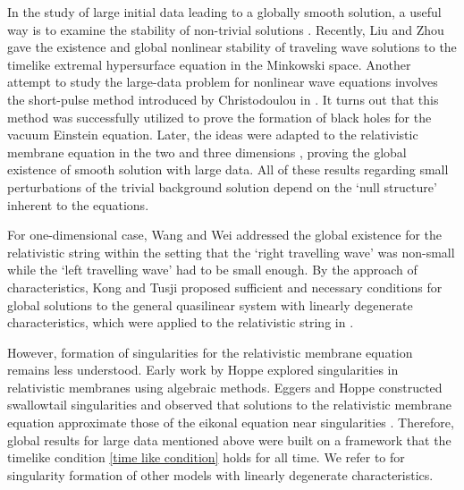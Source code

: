 \documentclass[10pt,leqno]{amsart}
\numberwithin{equation}{section}
\begin{document}
In the study of large initial data leading to a globally smooth solution, 
a useful way is to examine the stability of non-trivial solutions \cite{DonningerKS16}. Recently, Liu and Zhou \cite{LiuZhou24} gave the existence and global nonlinear stability of traveling wave solutions to the timelike extremal hypersurface equation in the Minkowski space. Another attempt to study the large-data problem for nonlinear wave equations involves the short-pulse method introduced by Christodoulou in \cite{Christodoulou09}. It turns out that this method was successfully utilized to prove the formation of black holes for the vacuum Einstein equation. Later, the ideas were adapted to the relativistic membrane equation in the two and three dimensions \cite{WangWei22}, proving the global existence of smooth solution with large data. All of these results regarding small perturbations of the trivial background solution depend on the `null structure' inherent to the equations. 


For one-dimensional case, Wang and Wei \cite{WangWei23} addressed the global existence for the relativistic string within the setting that the `right travelling wave' was non-small while the `left travelling wave' had to be small enough. By the approach of characteristics, Kong and Tusji \cite{KongTsuji99} proposed sufficient and necessary conditions for global solutions to the general quasilinear system with linearly degenerate characteristics, which were applied to the relativistic string in \cite{KongZhang07}.



However, formation of singularities for the relativistic membrane equation remains less understood. Early work by Hoppe \cite{Hoppe13} explored singularities in relativistic membranes using algebraic methods. Eggers and Hoppe \cite{Eggers09} constructed swallowtail singularities and observed that solutions to the relativistic membrane equation approximate those of the eikonal equation near singularities \cite{EggersHoppeHynek15}. Therefore, global results for large data mentioned above \cite{WangWei22,WangWei23} were built on a framework that the timelike condition \eqref{time like condition} holds for all time. We refer to \cite{KongWei14,KongWeiZhang14,LaiZhu22} for singularity formation of other models with linearly degenerate characteristics.
\end{document}
